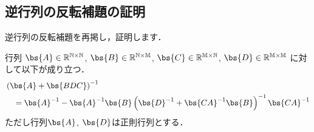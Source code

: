 %


\subsection{逆行列の反転補題の証明}

逆行列の反転補題を再掲し，証明します．

\begin{theorem}[逆行列の反転補題]
    行列
    $\bs{A} \in \mathbb{R^{N \times N}}$,
    $\bs{B} \in \mathbb{R^{N \times M}}$,
    $\bs{C} \in \mathbb{R^{M \times N}}$,
    $\bs{D} \in \mathbb{R^{M \times M}}$
    に対して以下が成り立つ．
    \begin{align*}
        &\left( \bs{A} + \bs{BDC} \right)^{-1} \\
        &\hspace{10pt}
        = \bs{A}^{-1} - \bs{A}^{-1} \bs{B} \left( \bs{D}^{-1} + \bs{CA}^{-1} \bs{B} \right)^{-1} \bs{CA}^{-1}
    \end{align*}
    ただし行列$\bs{A}$, $\bs{D}$は正則行列とする．
\end{theorem}
